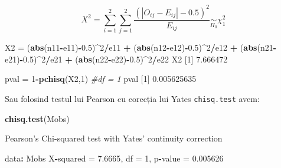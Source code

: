 \documentclass[]{article}
\newenvironment{Shaded}{\begin{snugshade}}{\end{snugshade}}
\newcommand{\KeywordTok}[1]{\textcolor[rgb]{0.13,0.29,0.53}{\textbf{#1}}}
\newcommand{\DecValTok}[1]{\textcolor[rgb]{0.00,0.00,0.81}{#1}}
\newcommand{\FloatTok}[1]{\textcolor[rgb]{0.00,0.00,0.81}{#1}}
\newcommand{\StringTok}[1]{\textcolor[rgb]{0.31,0.60,0.02}{#1}}
\newcommand{\CommentTok}[1]{\textcolor[rgb]{0.56,0.35,0.01}{\textit{#1}}}
\newcommand{\OperatorTok}[1]{\textcolor[rgb]{0.81,0.36,0.00}{\textbf{#1}}}
\newcommand{\NormalTok}[1]{#1}
\begin{document}
\[
  X^2 = \sum_{i=1}^{2}\sum_{j=1}^{2}\frac{\left(|O_{ij}-E_{ij}|-0.5\right)^2}{E_{ij}}\underset{H_0}{\sim}\chi_1^2
\]

\begin{Shaded}
\begin{Highlighting}[]
\NormalTok{X2 =}\StringTok{ }\NormalTok{(}\KeywordTok{abs}\NormalTok{(n11}\OperatorTok{-}\NormalTok{e11)}\OperatorTok{-}\FloatTok{0.5}\NormalTok{)}\OperatorTok{^}\DecValTok{2}\OperatorTok{/}\NormalTok{e11 }\OperatorTok{+}\StringTok{ }\NormalTok{(}\KeywordTok{abs}\NormalTok{(n12}\OperatorTok{-}\NormalTok{e12)}\OperatorTok{-}\FloatTok{0.5}\NormalTok{)}\OperatorTok{^}\DecValTok{2}\OperatorTok{/}\NormalTok{e12 }\OperatorTok{+}\StringTok{ }
\StringTok{  }\NormalTok{(}\KeywordTok{abs}\NormalTok{(n21}\OperatorTok{-}\NormalTok{e21)}\OperatorTok{-}\FloatTok{0.5}\NormalTok{)}\OperatorTok{^}\DecValTok{2}\OperatorTok{/}\NormalTok{e21 }\OperatorTok{+}\StringTok{ }\NormalTok{(}\KeywordTok{abs}\NormalTok{(n22}\OperatorTok{-}\NormalTok{e22)}\OperatorTok{-}\FloatTok{0.5}\NormalTok{)}\OperatorTok{^}\DecValTok{2}\OperatorTok{/}\NormalTok{e22}
\NormalTok{X2}
\NormalTok{[}\DecValTok{1}\NormalTok{] }\FloatTok{7.666472}

\NormalTok{pval =}\StringTok{ }\DecValTok{1}\OperatorTok{-}\KeywordTok{pchisq}\NormalTok{(X2,}\DecValTok{1}\NormalTok{) }\CommentTok{#df = 1}
\NormalTok{pval}
\NormalTok{[}\DecValTok{1}\NormalTok{] }\FloatTok{0.005625635}
\end{Highlighting}
\end{Shaded}

Sau folosind testul lui Pearson cu corecția lui Yates
\texttt{chisq.test} avem:

\begin{Shaded}
\begin{Highlighting}[]
\KeywordTok{chisq.test}\NormalTok{(Mobs)}

\NormalTok{    Pearson}\StringTok{'s Chi-squared test with Yates'}\NormalTok{ continuity correction}

\NormalTok{data}\OperatorTok{:}\StringTok{  }\NormalTok{Mobs}
\NormalTok{X}\OperatorTok{-}\NormalTok{squared =}\StringTok{ }\FloatTok{7.6665}\NormalTok{, df =}\StringTok{ }\DecValTok{1}\NormalTok{, p}\OperatorTok{-}\NormalTok{value =}\StringTok{ }\FloatTok{0.005626}
\end{Highlighting}
\end{Shaded}
\end{document}
